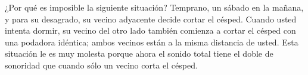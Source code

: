 \item ¿Por qué es imposible la siguiente situación? Temprano, un sábado en la mañana, y para su desagrado, su vecino adyacente decide cortar el césped. Cuando usted intenta dormir, su vecino del otro lado también comienza a cortar el césped con una podadora idéntica; ambos vecinos están a la misma distancia de usted. Esta situación le es muy molesta porque ahora el sonido total tiene el doble de sonoridad que cuando sólo un vecino corta el césped.